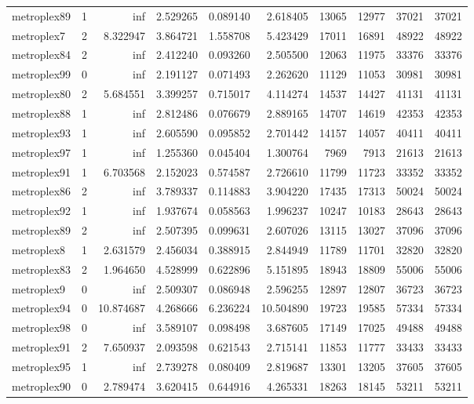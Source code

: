 \begin{longtable}{|l|r|r|r|r|r|r|r|r|r|}
metroplex89 & 1 & inf & 2.529265 & 0.089140 & 2.618405 & 13065 & 12977 & 37021 & 37021 \\
metroplex7 & 2 & 8.322947 & 3.864721 & 1.558708 & 5.423429 & 17011 & 16891 & 48922 & 48922 \\
metroplex84 & 2 & inf & 2.412240 & 0.093260 & 2.505500 & 12063 & 11975 & 33376 & 33376 \\
metroplex99 & 0 & inf & 2.191127 & 0.071493 & 2.262620 & 11129 & 11053 & 30981 & 30981 \\
metroplex80 & 2 & 5.684551 & 3.399257 & 0.715017 & 4.114274 & 14537 & 14427 & 41131 & 41131 \\
metroplex88 & 1 & inf & 2.812486 & 0.076679 & 2.889165 & 14707 & 14619 & 42353 & 42353 \\
metroplex93 & 1 & inf & 2.605590 & 0.095852 & 2.701442 & 14157 & 14057 & 40411 & 40411 \\
metroplex97 & 1 & inf & 1.255360 & 0.045404 & 1.300764 & 7969 & 7913 & 21613 & 21613 \\
metroplex91 & 1 & 6.703568 & 2.152023 & 0.574587 & 2.726610 & 11799 & 11723 & 33352 & 33352 \\
metroplex86 & 2 & inf & 3.789337 & 0.114883 & 3.904220 & 17435 & 17313 & 50024 & 50024 \\
metroplex92 & 1 & inf & 1.937674 & 0.058563 & 1.996237 & 10247 & 10183 & 28643 & 28643 \\
metroplex89 & 2 & inf & 2.507395 & 0.099631 & 2.607026 & 13115 & 13027 & 37096 & 37096 \\
metroplex8 & 1 & 2.631579 & 2.456034 & 0.388915 & 2.844949 & 11789 & 11701 & 32820 & 32820 \\
metroplex83 & 2 & 1.964650 & 4.528999 & 0.622896 & 5.151895 & 18943 & 18809 & 55006 & 55006 \\
metroplex9 & 0 & inf & 2.509307 & 0.086948 & 2.596255 & 12897 & 12807 & 36723 & 36723 \\
metroplex94 & 0 & 10.874687 & 4.268666 & 6.236224 & 10.504890 & 19723 & 19585 & 57334 & 57334 \\
metroplex98 & 0 & inf & 3.589107 & 0.098498 & 3.687605 & 17149 & 17025 & 49488 & 49488 \\
metroplex91 & 2 & 7.650937 & 2.093598 & 0.621543 & 2.715141 & 11853 & 11777 & 33433 & 33433 \\
metroplex95 & 1 & inf & 2.739278 & 0.080409 & 2.819687 & 13301 & 13205 & 37605 & 37605 \\
metroplex90 & 0 & 2.789474 & 3.620415 & 0.644916 & 4.265331 & 18263 & 18145 & 53211 & 53211 \\

\end{longtable}
